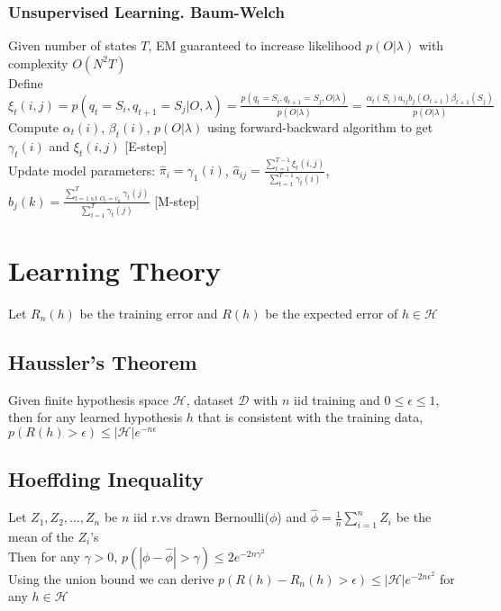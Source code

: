 \documentclass{article}
\renewcommand{\P}{p}
\renewcommand{\H}{\mathcal{H}}
\newcommand{\D}{\mathcal{D}}
\begin{document}
\subsubsection{Unsupervised Learning. Baum-Welch}
Given number of states $T$, EM guaranteed to increase likelihood $p(O| \lambda)$ with complexity $O(N^2T)$ \\
Define $\xi_t(i,j) = \P(q_t = S_i, q_{t+1} = S_j | O, \lambda) = \frac{\P(q_t = S_i, q_{t+1} = S_j, O | \lambda)}{\P(O | \lambda)} = \frac{\alpha_t(S_i)a_{ij}b_j(O_{t+1})\beta_{t+1}(S_j)}{\P(O | \lambda)}$ \\
Compute $\alpha_t(i)$, $\beta_t(i)$, $\P(O| \lambda)$ using forward-backward algorithm to get $\gamma_t(i)$ and $\xi_t(i,j)$ [E-step] \\
Update model parameters: $\hat{\pi}_i = \gamma_1(i)$, $\hat{a}_{ij} = \frac{\sum_{t=1}^{T-1}\xi_t(i,j)}{\sum_{t=1}^{T-1}\gamma_t(i)}$, $\hat{b}_j(k) = \frac{\sum_{t=1 \text{ s.t } O_t = v_k}^{T} \gamma_t(j)}{\sum_{t=1}^{T}\gamma_t(j)}$ [M-step] 

\section{Learning Theory}
Let $R_n(h)$ be the training error and $R(h)$ be the expected error of $h \in \H$ 

\subsection{Haussler's Theorem}
Given finite hypothesis space $\H$, dataset $\D$ with $n$ iid training and $0 \leq \epsilon \leq 1$, then for any learned hypothesis $h$ that is consistent with the training data, $\P(R(h) > \epsilon) \leq |\H| e ^{-n\epsilon}$

\subsection{Hoeffding Inequality}
Let $Z_1, Z_2, ..., Z_n$ be $n$ iid r.vs drawn Bernoulli($\phi$) and $\hat{\phi} = \frac{1}{n}\sum_{i=1}^n Z_i$ be the mean of the $Z_i$'s \\ Then for any $\gamma > 0$, $\P(|\phi - \hat{\phi}| > \gamma) \leq 2e^{-2n\gamma^2}$ \\
Using the union bound we can derive $\P(R(h) - R_n(h) > \epsilon) \leq |\H| e^{-2n\epsilon^2}$ for any $h \in \H$
\end{document}
